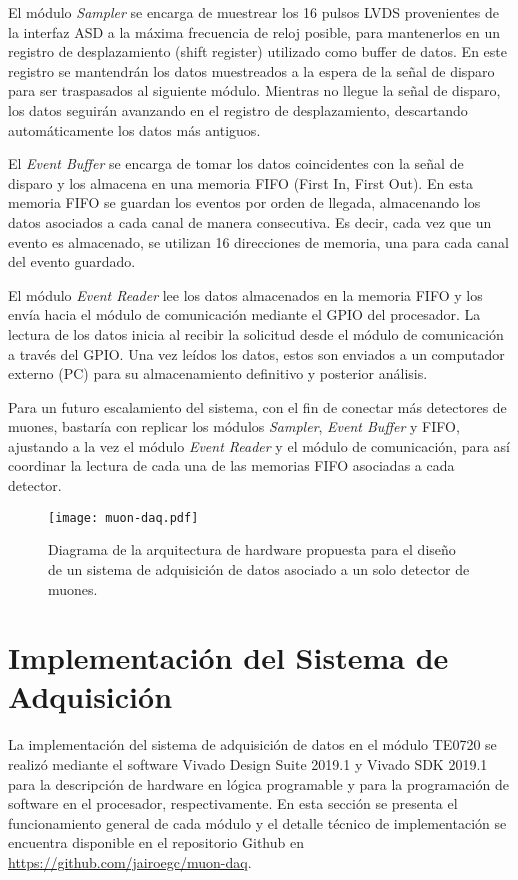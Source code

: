 		El módulo \textit{Sampler} se encarga de muestrear los 16 pulsos LVDS provenientes de la interfaz ASD a la máxima frecuencia de reloj posible, para mantenerlos en un registro de desplazamiento (shift register) utilizado como buffer de datos. En este registro se mantendrán los datos muestreados a la espera de la señal de disparo para ser traspasados al siguiente módulo. Mientras no llegue la señal de disparo, los datos seguirán avanzando en el registro de desplazamiento, descartando automáticamente los datos más antiguos.
		
		El \textit{Event Buffer} se encarga de tomar los datos coincidentes con la señal de disparo y los almacena en una memoria FIFO (First In, First Out)\cite{XilinxFIFOSuite}. En esta memoria FIFO se guardan los eventos por orden de llegada, almacenando los datos asociados a cada canal de manera consecutiva. Es decir, cada vez que un evento es almacenado, se utilizan 16 direcciones de memoria, una para cada canal del evento guardado.
		
		El módulo \textit{Event Reader} lee los datos almacenados en la memoria FIFO y los envía hacia el módulo de comunicación mediante el GPIO del procesador. La lectura de los datos inicia al recibir la solicitud desde el módulo de comunicación a través del GPIO. Una vez leídos los datos, estos son enviados a un computador externo (PC) para su almacenamiento definitivo y posterior análisis.
		
		Para un futuro escalamiento del sistema, con el fin de conectar más detectores de muones, bastaría con replicar los módulos \textit{Sampler}, \textit{Event Buffer} y FIFO, ajustando a la vez el módulo \textit{Event Reader} y el módulo de comunicación, para así coordinar la lectura de cada una de las memorias FIFO asociadas a cada detector.
		
		
		\begin{figure}[H]
			\centering
			\texttt{[image: muon-daq.pdf]}
			\caption{Diagrama de la arquitectura de hardware propuesta para el diseño de un sistema de adquisición de datos asociado a un solo detector de muones.}
			\label{fig:muon-daq}
		\end{figure}
		
\section{Implementación del Sistema de Adquisición}
	La implementación del sistema de adquisición de datos en el módulo TE0720 se realizó mediante el software Vivado Design Suite 2019.1 y Vivado SDK 2019.1  para la descripción de hardware en lógica programable y  para la programación de software en el procesador, respectivamente. En esta sección se presenta el funcionamiento general de cada módulo y el detalle técnico de implementación se encuentra disponible en el repositorio Github en \url{https://github.com/jairoegc/muon-daq}.
	
